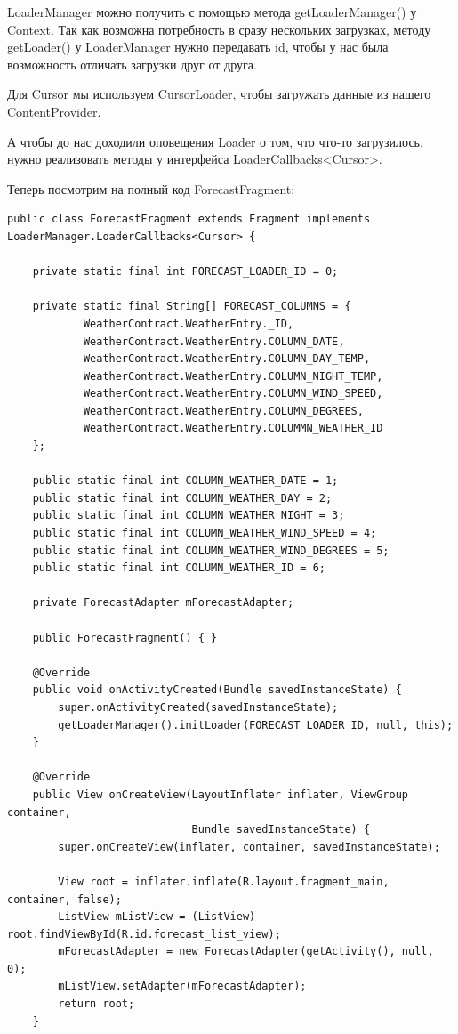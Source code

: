 \documentclass[12 pt]{article}
\begin{document}
    LoaderManager можно получить с помощью метода getLoaderManager() у Context. Так как возможна потребность в сразу нескольких загрузках, методу getLoader() у LoaderManager нужно передавать id, чтобы у нас была возможность отличать загрузки друг от друга.
    
    Для Cursor мы используем CursorLoader, чтобы загружать данные из нашего ContentProvider.
    
    А чтобы до нас доходили оповещения Loader о том, что что-то загрузилось, нужно реализовать методы у интерфейса LoaderCallbacks<Cursor>.
    
    Теперь посмотрим на полный код ForecastFragment:
    \begin{lstlisting}
public class ForecastFragment extends Fragment implements LoaderManager.LoaderCallbacks<Cursor> {

    private static final int FORECAST_LOADER_ID = 0;

    private static final String[] FORECAST_COLUMNS = {
            WeatherContract.WeatherEntry._ID,
            WeatherContract.WeatherEntry.COLUMN_DATE,
            WeatherContract.WeatherEntry.COLUMN_DAY_TEMP,
            WeatherContract.WeatherEntry.COLUMN_NIGHT_TEMP,
            WeatherContract.WeatherEntry.COLUMN_WIND_SPEED,
            WeatherContract.WeatherEntry.COLUMN_DEGREES,
            WeatherContract.WeatherEntry.COLUMMN_WEATHER_ID
    };

    public static final int COLUMN_WEATHER_DATE = 1;
    public static final int COLUMN_WEATHER_DAY = 2;
    public static final int COLUMN_WEATHER_NIGHT = 3;
    public static final int COLUMN_WEATHER_WIND_SPEED = 4;
    public static final int COLUMN_WEATHER_WIND_DEGREES = 5;
    public static final int COLUMN_WEATHER_ID = 6;

    private ForecastAdapter mForecastAdapter;

    public ForecastFragment() { }

    @Override
    public void onActivityCreated(Bundle savedInstanceState) {
        super.onActivityCreated(savedInstanceState);
        getLoaderManager().initLoader(FORECAST_LOADER_ID, null, this);
    }

    @Override
    public View onCreateView(LayoutInflater inflater, ViewGroup container,
                             Bundle savedInstanceState) {
        super.onCreateView(inflater, container, savedInstanceState);

        View root = inflater.inflate(R.layout.fragment_main, container, false);
        ListView mListView = (ListView) root.findViewById(R.id.forecast_list_view);
        mForecastAdapter = new ForecastAdapter(getActivity(), null, 0);
        mListView.setAdapter(mForecastAdapter);
        return root;
    }


\end{lstlisting}
\end{document}
